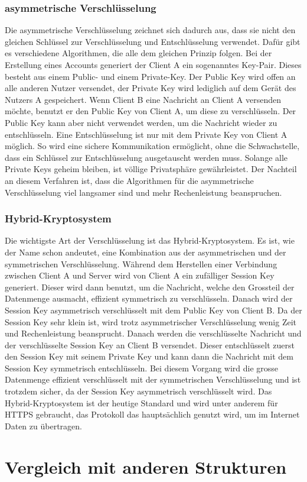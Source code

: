 \subsubsection{asymmetrische Verschlüsselung}
Die asymmetrische Verschlüsselung zeichnet sich dadurch aus, dass sie nicht den gleichen Schlüssel zur Verschlüsselung und Entschlüsselung verwendet. Dafür gibt es verschiedene Algorithmen, die alle dem gleichen Prinzip folgen. Bei der Erstellung eines Accounts generiert der Client A ein sogenanntes Key-Pair. Dieses besteht aus einem Public- und einem Private-Key. Der Public Key wird offen an alle anderen Nutzer versendet, der Private Key wird lediglich auf dem Gerät des Nutzers A gespeichert. Wenn Client B eine Nachricht an Client A versenden möchte, benutzt er den Public Key von Client A, um diese zu verschlüsseln. Der Public Key kann aber nicht verwendet werden, um die Nachricht wieder zu entschlüsseln. Eine Entschlüsselung ist nur mit dem Private Key von Client A möglich. So wird eine sichere Kommunikation ermöglicht, ohne die Schwachstelle, dass ein Schlüssel zur Entschlüsselung ausgetauscht werden muss. Solange alle Private Keys geheim bleiben, ist völlige Privatsphäre gewährleistet. Der Nachteil an diesem Verfahren ist, dass die Algorithmen für die asymmetrische Verschlüsselung viel langsamer sind und mehr Rechenleistung beanspruchen.
\subsubsection{Hybrid-Kryptosystem}
Die wichtigste Art der Verschlüsselung ist das Hybrid-Kryptosystem. Es ist, wie der Name schon andeutet, eine Kombination aus der asymmetrischen und der symmetrischen Verschlüsselung. Während dem Herstellen einer Verbindung zwischen Client A und Server wird von Client A ein zufälliger Session Key generiert. Dieser wird dann benutzt, um die Nachricht, welche den Grossteil der Datenmenge ausmacht, effizient symmetrisch zu verschlüsseln. Danach wird der Session Key asymmetrisch verschlüsselt mit dem Public Key von Client B. Da der Session Key sehr klein ist, wird trotz asymmetrischer Verschlüsselung wenig Zeit und Rechenleistung beansprucht. Danach werden die verschlüsselte Nachricht und der verschlüsselte Session Key an Client B versendet. Dieser entschlüsselt zuerst den Session Key mit seinem Private Key und kann dann die Nachricht mit dem Session Key symmetrisch entschlüsseln. Bei diesem Vorgang wird die grosse Datenmenge effizient verschlüsselt mit der symmetrischen Verschlüsselung und ist trotzdem sicher, da der Session Key asymmetrisch verschlüsselt wird. Das Hybrid-Kryptosystem ist der heutige Standard und wird unter anderem für HTTPS gebraucht, das Protokoll das hauptsächlich genutzt wird, um im Internet Daten zu übertragen.
\section{Vergleich mit anderen Strukturen}
